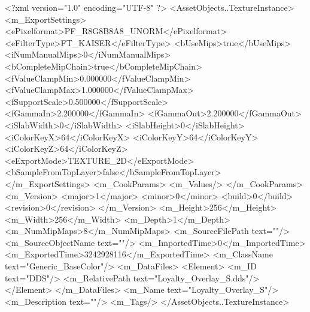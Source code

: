 <?xml version="1.0" encoding="UTF-8" ?>
<AssetObjects..TextureInstance>
	<m_ExportSettings>
		<ePixelformat>PF_R8G8B8A8_UNORM</ePixelformat>
		<eFilterType>FT_KAISER</eFilterType>
		<bUseMips>true</bUseMips>
		<iNumManualMips>0</iNumManualMips>
		<bCompleteMipChain>true</bCompleteMipChain>
		<fValueClampMin>0.000000</fValueClampMin>
		<fValueClampMax>1.000000</fValueClampMax>
		<fSupportScale>0.500000</fSupportScale>
		<fGammaIn>2.200000</fGammaIn>
		<fGammaOut>2.200000</fGammaOut>
		<iSlabWidth>0</iSlabWidth>
		<iSlabHeight>0</iSlabHeight>
		<iColorKeyX>64</iColorKeyX>
		<iColorKeyY>64</iColorKeyY>
		<iColorKeyZ>64</iColorKeyZ>
		<eExportMode>TEXTURE_2D</eExportMode>
		<bSampleFromTopLayer>false</bSampleFromTopLayer>
	</m_ExportSettings>
	<m_CookParams>
		<m_Values/>
	</m_CookParams>
	<m_Version>
		<major>1</major>
		<minor>0</minor>
		<build>0</build>
		<revision>0</revision>
	</m_Version>
	<m_Height>256</m_Height>
	<m_Width>256</m_Width>
	<m_Depth>1</m_Depth>
	<m_NumMipMaps>8</m_NumMipMaps>
	<m_SourceFilePath text=""/>
	<m_SourceObjectName text=""/>
	<m_ImportedTime>0</m_ImportedTime>
	<m_ExportedTime>3242928116</m_ExportedTime>
	<m_ClassName text="Generic_BaseColor"/>
	<m_DataFiles>
		<Element>
			<m_ID text="DDS"/>
			<m_RelativePath text="Loyalty_Overlay_{S}.dds"/>
		</Element>
	</m_DataFiles>
	<m_Name text="Loyalty_Overlay_{S}"/>
	<m_Description text=""/>
	<m_Tags/>
</AssetObjects..TextureInstance>

